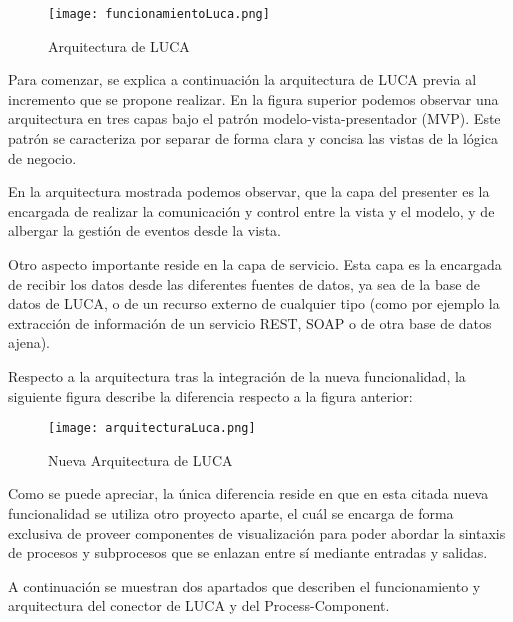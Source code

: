 \begin{figure}[H]
	\centering
	\texttt{[image: funcionamientoLuca.png]}
	\caption{Arquitectura de LUCA}\label{fig:funcionamientoLuca}
\end{figure}


Para comenzar, se explica a continuación la arquitectura de LUCA previa al incremento que se propone realizar.
En la figura superior podemos observar una arquitectura en tres capas bajo el patrón modelo-vista-presentador (MVP). Este patrón se caracteriza por separar de forma clara y concisa las vistas de la lógica de negocio.

\vspace{5mm}

En la arquitectura mostrada podemos observar, que la capa del presenter es la encargada de realizar la comunicación y control entre la vista y el modelo, y de albergar la gestión de eventos desde la vista.

\vspace{5mm}

Otro aspecto importante reside en la capa de servicio. Esta capa es la encargada de recibir los datos desde las diferentes fuentes de datos, ya sea de la base de datos de LUCA, o de un recurso externo de cualquier tipo (como por ejemplo la extracción de  información de un servicio REST, SOAP o de otra base de datos ajena).

\vspace{5mm}

Respecto a la arquitectura tras la integración de la nueva funcionalidad, la siguiente figura describe la diferencia respecto a la figura anterior:

\begin{figure}[H]
	\centering
	\texttt{[image: arquitecturaLuca.png]}
	\caption{Nueva Arquitectura de LUCA}\label{fig:arquitecturaLuca}
\end{figure}

Como se puede apreciar, la única diferencia reside en que en esta citada nueva funcionalidad se utiliza otro proyecto aparte, el cuál se encarga de forma exclusiva de proveer componentes de visualización para poder abordar la sintaxis de procesos y subprocesos que se enlazan entre sí mediante entradas y salidas.

\vspace{5mm}

A continuación se muestran dos apartados que describen el funcionamiento y arquitectura del conector de LUCA y del Process-Component.

